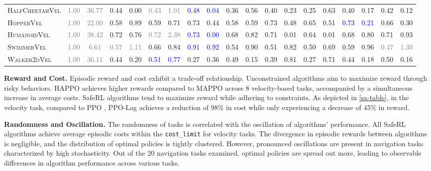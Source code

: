 \documentclass{article}
\begin{document}
\begin{table}[ht]
{\begin{tabular}{@{}l|cc|cc|cc|cc|cc|cc|cc|cc|cc@{}}
\textsc{HalfCheetahVel} & \textcolor{gray}{1.00} & \textcolor{gray}{36.77} & 0.44 & 0.00 & \textcolor{gray}{0.43} & \textcolor{gray}{1.01} & \textcolor{blue}{0.48} & \textcolor{blue}{0.04} & 0.36 & 0.56 & 0.40 & 0.23 & 0.25 & 0.63 & 0.40 & 0.17 & 0.42 & 0.12 \\
\textsc{HopperVel} & \textcolor{gray}{1.00} & \textcolor{gray}{22.00} & 0.58 & 0.89 & 0.59 & 0.71 & 0.73 & 0.44 & 0.58 & 0.59 & 0.73 & 0.48 & 0.65 & 0.51 & \textcolor{blue}{0.73} & \textcolor{blue}{0.21} & 0.66 & 0.30 \\
\textsc{HumanoidVel} & \textcolor{gray}{1.00} & \textcolor{gray}{38.42} & 0.72 & 0.76 & \textcolor{gray}{0.72} & \textcolor{gray}{2.38} & \textcolor{blue}{0.73} & \textcolor{blue}{0.00} & 0.68 & 0.82 & 0.71 & 0.01 & 0.64 & 0.01 & 0.68 & 0.80 & 0.71 & 0.93 \\
\textsc{SwimmerVel} & \textcolor{gray}{1.00} & \textcolor{gray}{6.61} & \textcolor{gray}{0.57} & \textcolor{gray}{1.11} & 0.66 & 0.84 & \textcolor{blue}{0.91} & \textcolor{blue}{0.92} & 0.54 & 0.90 & 0.51 & 0.82 & 0.50 & 0.69 & 0.59 & 0.96 & \textcolor{gray}{0.47} & \textcolor{gray}{1.30} \\
\textsc{Walker2dVel} & \textcolor{gray}{1.00} & \textcolor{gray}{36.11} & 0.44 & 0.20 & \textcolor{blue}{0.51} & \textcolor{blue}{0.77} & 0.27 & 0.36 & 0.49 & 0.15 & 0.39 & 0.81 & 0.27 & 0.71 & 0.44 & 0.18 & 0.50 & 0.16 \\
\bottomrule
\end{tabular}
\label{sa-table}
}
\end{table}
\textbf{Reward and Cost.}
Episodic reward and cost exhibit a trade-off relationship. Unconstrained algorithms aim to maximize reward through risky behaviors. HAPPO \cite{kuba2021trust} achieves higher rewards compared to MAPPO \cite{yu2022surprising} across 8 velocity-based tasks, accompanied by a simultaneous increase in average costs. SafeRL algorithms tend to maximize reward while adhering to constraints. As depicted in \autoref{sa-table}, in the velocity task, compared to PPO \cite{schulman2017proximal}, PPO-Lag \cite{ray2019benchmarking} achieves a reduction of $98\%$ in cost while only experiencing a decrease of $45\%$ in reward.

\textbf{Randomness and Oscillation.}
The randomness of tasks is correlated with the oscillation of algorithms' performance. All SafeRL algorithms achieve average episodic costs within the \texttt{cost\_limit} for velocity tasks. The divergence in episodic rewards between algorithms is negligible, and the distribution of optimal policies is tightly clustered. However, pronounced oscillations are present in navigation tasks characterized by high stochasticity. 
Out of the 20 navigation tasks examined, optimal policies are spread out more, leading to observable differences in algorithm performance across various tasks.
\end{document}
